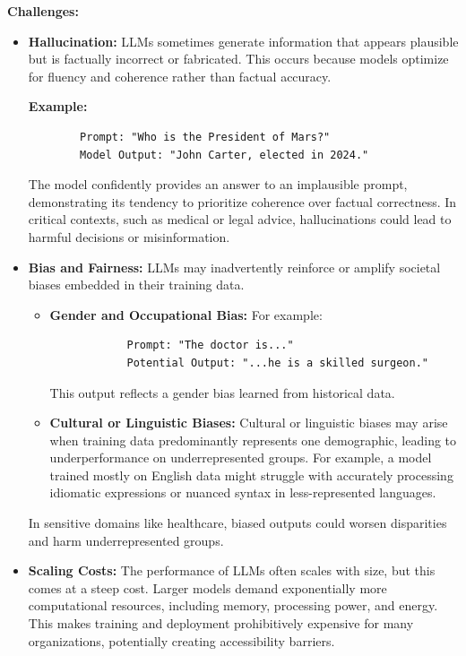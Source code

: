     \textbf{Challenges:}
    \begin{itemize}
        \item \textbf{Hallucination:} LLMs sometimes generate information that appears plausible but is factually incorrect or fabricated. This occurs because models optimize for fluency and coherence rather than factual accuracy. 

        \textbf{Example:} 
        \begin{verbatim}
        Prompt: "Who is the President of Mars?"
        Model Output: "John Carter, elected in 2024."
        \end{verbatim}
        The model confidently provides an answer to an implausible prompt, demonstrating its tendency to prioritize coherence over factual correctness. In critical contexts, such as medical or legal advice, hallucinations could lead to harmful decisions or misinformation.

        \item \textbf{Bias and Fairness:} LLMs may inadvertently reinforce or amplify societal biases embedded in their training data. 
        \begin{itemize}
            \item \textbf{Gender and Occupational Bias:} For example:
            \begin{verbatim}
            Prompt: "The doctor is..."
            Potential Output: "...he is a skilled surgeon."
            \end{verbatim}
            This output reflects a gender bias learned from historical data.
            \item \textbf{Cultural or Linguistic Biases:} Cultural or linguistic biases may arise when training data predominantly represents one demographic, leading to underperformance on underrepresented groups. For example, a model trained mostly on English data might struggle with accurately processing idiomatic expressions or nuanced syntax in less-represented languages.
        \end{itemize}
        In sensitive domains like healthcare, biased outputs could worsen disparities and harm underrepresented groups.

        \item \textbf{Scaling Costs:} The performance of LLMs often scales with size, but this comes at a steep cost. Larger models demand exponentially more computational resources, including memory, processing power, and energy. This makes training and deployment prohibitively expensive for many organizations, potentially creating accessibility barriers.


\end{itemize}
